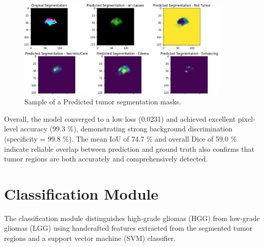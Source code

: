 \begin{figure}[h]
  \centering
  \includegraphics[width=0.9\textwidth]{Images/Chapter3/seg.png}
  \caption{Sample of a Predicted tumor segmentation masks.}
  \label{fig:segmentation-example}
\end{figure}




Overall, the model converged to a low loss (0.0231) and achieved excellent pixel‐level accuracy (99.3 \%), demonstrating strong background discrimination (specificity = 99.8 \%). The mean IoU of 74.7 \% and overall Dice of 59.0 \% indicate reliable overlap between prediction and ground truth also confirms that tumor regions are both accurately and comprehensively detected.


\section{Classification Module}
\label{sec:contribution-classification}

The classification module distinguishes high‐grade gliomas (HGG) from low‐grade gliomas (LGG) using handcrafted features extracted from the segmented tumor regions and a support vector machine (SVM) classifier.
